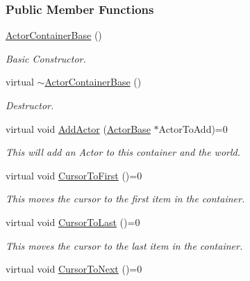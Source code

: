 \subsubsection*{Public Member Functions}
\begin{DoxyCompactItemize}
\item 
\hyperlink{classMezzanine_1_1ActorContainerBase_a1cde28138d1b72713b87c9b1a4cbe9d1}{ActorContainerBase} ()
\begin{DoxyCompactList}\small\item\em Basic Constructor. \item\end{DoxyCompactList}\item 
virtual \hyperlink{classMezzanine_1_1ActorContainerBase_aab089925fd04d1591f2932d25edf0f52}{$\sim$ActorContainerBase} ()
\begin{DoxyCompactList}\small\item\em Destructor. \item\end{DoxyCompactList}\item 
virtual void \hyperlink{classMezzanine_1_1ActorContainerBase_aba981ad61ed549531a22d520ba2a231c}{AddActor} (\hyperlink{classMezzanine_1_1ActorBase}{ActorBase} $\ast$ActorToAdd)=0
\begin{DoxyCompactList}\small\item\em This will add an Actor to this container and the world. \item\end{DoxyCompactList}\item 
virtual void \hyperlink{classMezzanine_1_1ActorContainerBase_a7e26df0af80a28be01d0aaef7d350a65}{CursorToFirst} ()=0
\begin{DoxyCompactList}\small\item\em This moves the cursor to the first item in the container. \item\end{DoxyCompactList}\item 
virtual void \hyperlink{classMezzanine_1_1ActorContainerBase_a3f90f7b919bb821389f1493c6c121cce}{CursorToLast} ()=0
\begin{DoxyCompactList}\small\item\em This moves the cursor to the last item in the container. \item\end{DoxyCompactList}\item 
virtual void \hyperlink{classMezzanine_1_1ActorContainerBase_a906736a79fc92f45ae0cb73cfa2e7ed3}{CursorToNext} ()=0

\end{DoxyCompactItemize}

